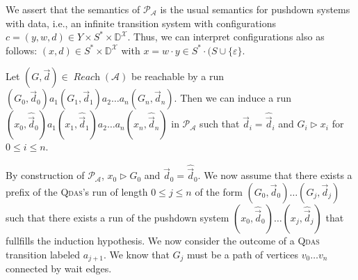 \documentclass[runningheads,oribibl,]{article}
\newcommand{\Aa}{\ensuremath{\mathcal{A}}\xspace}
\newcommand{\Pp}{\ensuremath{\mathcal{P}}\xspace}
\newcommand{\Xx}{\ensuremath{\mathcal{X}}\xspace}
\newcommand{\e}{\ensuremath{\varepsilon}\xspace}
\newcommand{\DD}{\ensuremath{\mathbb{D}}\xspace}
\newcommand{\qdas}{\textsc{Qdas}\xspace}
\DeclareMathOperator{\Reach}{\textit{Reach}}
\newcommand{\Graph}{\ensuremath{G}}
\newcommand{\Data}{\ensuremath{\vec{d}}}
\newcommand{\DData}{\ensuremath{\widehat{\vec{d}}}}
\newenvironment{proof}{\noindent{\it Proof.\hspace*{.5cm}}}{}
\begin{document}
\propsyncqdaspds*
\begin{proof}
  We assert that the semantics of $\Pp_\Aa$ is the usual semantics for
  pushdown systems with data, i.e., an infinite transition system with
  configurations $c=(y,w,d)\in Y\times S^* \times \DD^\Xx$.
  Thus, we can interpret configurations also as follows:
  $(x,d)\in S^*\times \DD^\Xx$ with $x=w\cdot y\in S^*\cdot (S\cup\{\e\}$.

  Let $(\Graph,\Data)\in\Reach(\Aa)$ be reachable by a run
  $(\Graph_0,\Data_0)a_1(\Graph_1,\Data_1)a_2\dots a_n(\Graph_n,\Data_n)$.
  Then we can induce a run $(x_0,\DData_0)a_1(x_1,\DData_1)a_2\dots
  a_n(x_n,\DData_n)$ in $\Pp_\Aa$ such that $\Data_i=\DData_i$ and
  $\Graph_i\triangleright x_i$ for $0\leq i \leq n$.

  By construction of $\Pp_\Aa$, $x_0\triangleright G_0$ and $\Data_0=\DData_0$.
  We now assume that there exists a prefix of the \qdas's run of length $0\leq
  j\leq n$ of the form
  $(\Graph_0,\Data_0)\dots
  (\Graph_j,\Data_j)$ such that there exists a run of the pushdown system
  $(x_0,\DData_0)\dots(x_j,\DData_j)$ that fullfills the induction hypothesis.
  We now consider the outcome of a \qdas transition labeled $a_{j+1}$.
  We know that $\Graph_j$ must be a path of vertices $v_0\dots v_n$ connected
  by wait edges.


\end{proof}
\end{document}
